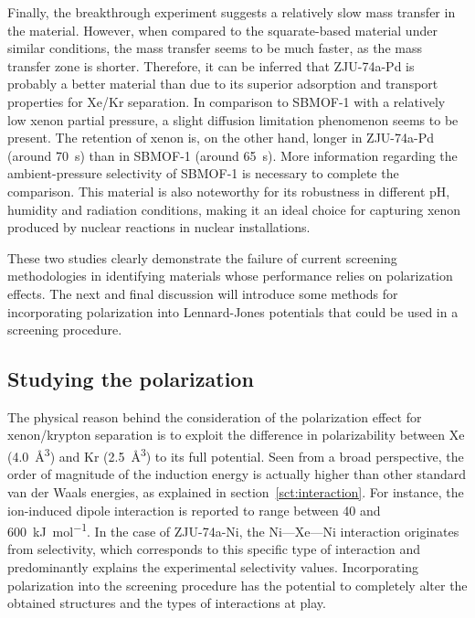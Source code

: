 \documentclass[main]{subfiles}
\begin{document}
Finally, the breakthrough experiment suggests a relatively slow mass transfer in the material. However, when compared to the squarate-based material under similar conditions, the mass transfer seems to be much faster, as the mass transfer zone is shorter. Therefore, it can be inferred that ZJU-74a-Pd is probably a better material than  due to its superior adsorption and transport properties for Xe/Kr separation. In comparison to SBMOF-1 with a relatively low xenon partial pressure, a slight diffusion limitation phenomenon seems to be present. The retention of xenon is, on the other hand, longer in ZJU-74a-Pd (around \SI{70}{\s}) than in SBMOF-1 (around \SI{65}{\s}). More information regarding the ambient-pressure selectivity of SBMOF-1 is necessary to complete the comparison.
This material is also noteworthy for its robustness in different pH, humidity and radiation conditions, making it an ideal choice for capturing xenon produced by nuclear reactions in nuclear installations.

These two studies clearly demonstrate the failure of current screening methodologies in identifying materials whose performance relies on polarization effects. The next and final discussion will introduce some methods for incorporating polarization into Lennard-Jones potentials that could be used in a screening procedure.

\subsection{Studying the polarization}

The physical reason behind the consideration of the polarization effect for xenon/krypton separation is to exploit the difference in polarizability between Xe (\SI{4.0}{\cubic\angstrom}) and Kr (\SI{2.5}{\cubic\angstrom})\autocite{Olney1997} to its full potential. Seen from a broad perspective, the order of magnitude of the induction energy is actually higher than other standard van der Waals energies, as explained in section~\ref{sct:interaction}. For instance, the ion-induced dipole interaction is reported to range between 40 and 600~\si{\kJ\per\mol}. In the case of ZJU-74a-Ni, the Ni---Xe---Ni interaction originates from selectivity, which corresponds to this specific type of interaction and predominantly explains the experimental selectivity values. Incorporating polarization into the screening procedure has the potential to completely alter the obtained structures and the types of interactions at play.
\end{document}
